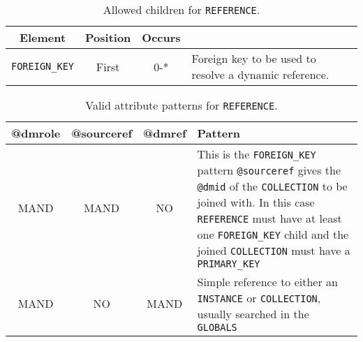 \begin{table}[!htbp]
\small
\centering
\begin{tabulary}{\linewidth}{|c |c |c|J|}
    \hline 
        \textbf{Element} &
        \textbf{Position} &
        \textbf{Occurs} &
        \\
    \hline      \hline  
        \texttt{FOREIGN\_KEY}  &        
        First &           
        0-* &
        Foreign key to be used to resolve a dynamic reference.\\
    \hline 
\end{tabulary}
     \caption{Allowed children for \texttt{REFERENCE}.} 
     \label{tbl:reference-children}
\end{table}


\begin{table}[!htbp]
\small
\centering
\begin{tabulary}{\linewidth}{|c|c|c|J|}
    \hline 
        \textbf{@dmrole} &
        \textbf{@sourceref} &
        \textbf{@dmref} &
        \textbf{Pattern}\\
    \hline      \hline  
        MAND &           
        MAND &           
        NO &           
        This is the \texttt{FOREIGN\_KEY} pattern \texttt{@sourceref} gives the  \texttt{@dmid} of the \texttt{COLLECTION} to be joined with. In this case \texttt{REFERENCE} must have at least one \texttt{FOREIGN\_KEY} child and the joined \texttt{COLLECTION} must have a \texttt{PRIMARY\_KEY}\\
    \hline   
        MAND &           
        NO &           
        MAND &           
        Simple reference to either an \texttt{INSTANCE} or \texttt{COLLECTION}, usually searched in the \texttt{GLOBALS}\\
   \hline 
\end{tabulary}
     \caption{Valid attribute patterns for  \texttt{REFERENCE}.}
     \label{tbl:reference-pattern}
\end{table}

